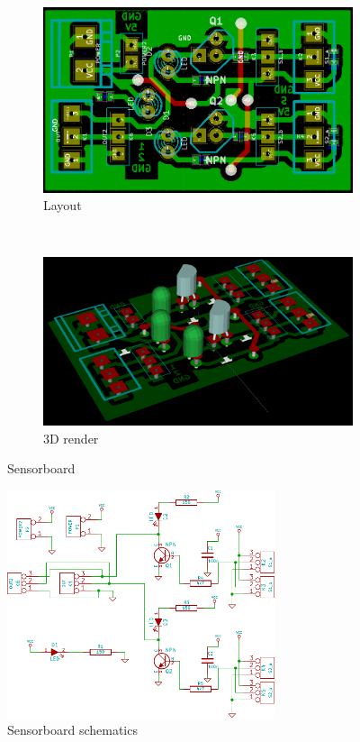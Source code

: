 \documentclass[a4paper
               ,10pt
               ,DIV=10 %
               ,BCOR=0.3cm
               ,pagesize %
               ,headings=small
               ,bibtotoc
               ]
               {scrartcl}
\begin{document}
\begin{figure}[H]
  \centering
  \begin{subfigure}[b]{0.5\textwidth}
  \centering
  \includegraphics[width=\textwidth]{pic/sensorboardbrd.png}
  \caption{Layout}
  \label{figsensorboardbrd}
  \end{subfigure}~
  \begin{subfigure}[b]{0.5\textwidth}
  \centering
  \includegraphics[width=\textwidth]{pic/sensorboard3d.png}
  \caption{3D render}
  \label{figsensorboard3d}
  \end{subfigure}
  \caption{Sensorboard}
  \label{figsensorboard}
\end{figure}


\begin{figure}[htb]
\begin{center}
\includegraphics[width=0.7\textwidth]{pic/sensorboard}
\caption{Sensorboard schematics}
\label{figsensorboardscm}
\end{center}
\end{figure}
\end{document}
